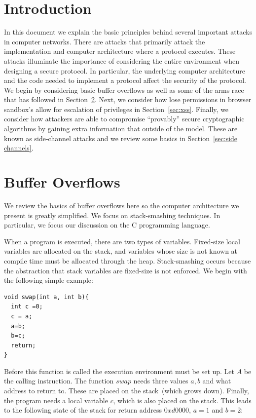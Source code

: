 \documentclass{article}
\begin{document}
\section{Introduction}
In this document we explain the basic principles behind several important attacks in computer networks.  There are attacks that primarily attack the implementation and computer architecture where a protocol executes.  These attacks illuminate the importance of considering the entire environment when designing a secure protocol.  In particular, the underlying computer architecture and the code needed to implement a protocol affect the security of the protocol.  We begin by considering basic buffer overflows as well as some of the arms race that has followed in Section~\ref{sec:buffer overflows}.  Next, we consider how lose permissions in browser sandbox's allow for escalation of privileges in Section~\ref{sec:xss}.  Finally, we consider how attackers are able to compromise ``provably'' secure cryptographic algorithms by gaining extra information that outside of the model.  These are known as side-channel attacks and we review some basics in Section~\ref{sec:side channels}.

\section{Buffer Overflows}\label{sec:buffer overflows}
We review the basics of buffer overflows here so the computer architecture we present is greatly simplified.  We focus on stack-smashing techniques.  In particular, we focus our discussion on the C programming language.

When a program is executed, there are two types of variables.  Fixed-size local variables are allocated on the stack, and variables whose size is not known at compile time must be allocated through the heap.  Stack-smashing occurs because the abstraction that stack variables are fixed-size is not enforced.  We begin with the following simple example:

\begin{lstlisting}
void swap(int a, int b){
  int c =0;
  c = a;
  a=b;
  b=c;
  return;
}
\end{lstlisting}

Before this function is called the execution environment must be set up.  Let $A$ be the calling instruction.  The function $swap$ needs three values $a, b$ and what address to return to.  These are placed on the stack~(which grows down).  Finally, the program needs a local variable $c$, which is also placed on the stack.  This leads to the following state of the stack for return address $0xd0000$, $a=1$ and $b=2$:
\end{document}
